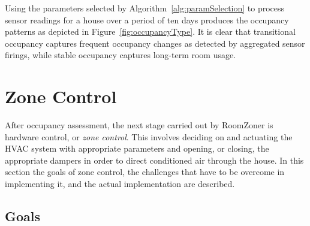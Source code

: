 Using the parameters selected by Algorithm~\ref{alg:paramSelection} to process
sensor readings for a house over a period of ten days produces the occupancy
patterns as depicted in Figure~\ref{fig:occupancyType}. It is clear that
transitional occupancy captures frequent occupancy changes as detected by
aggregated sensor firings, while stable occupancy captures long-term room usage.

\begin{figure}[!htb]
\end{figure}

\section{Zone Control}
\label{sec:zoneControl}

After occupancy assessment, the next stage carried out by RoomZoner is hardware
control, or {\em zone control}. This involves deciding on and actuating the HVAC
system with appropriate parameters and opening, or closing, the appropriate
dampers in order to direct conditioned air through the house. In this section
the goals of zone control, the challenges that have to be overcome in
implementing it, and the actual implementation are described.

\subsection{Goals}
\label{sec:zoneControlGoals}

